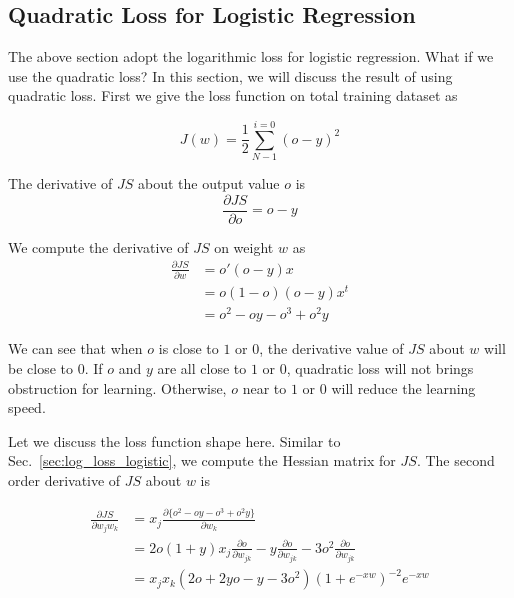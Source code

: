 \documentclass[runningheads,openany]{xhlPaper}
\begin{document}
\subsection{Quadratic Loss for Logistic Regression}
The above section adopt the logarithmic loss for logistic regression. What if we use the quadratic loss?
In this section, we will discuss the result of using quadratic loss.
First we give the loss function on total training dataset as

\begin{displaymath}
J\left ( w \right ) = \frac{1}{2} \sum_{N-1}^{i = 0} \left ( o - y \right ) ^ 2
\end{displaymath}

The derivative of $JS$ about the output value $o$ is
\begin{displaymath}
\frac{\partial JS}{\partial o} = o - y
\end{displaymath}

We compute the derivative of $JS$ on weight $w$ as
\begin{displaymath}
\begin{aligned}
\frac{\partial JS}{\partial w}&={o}{'}\left ( o - y \right )x\\
&=o\left ( 1 - o \right )\left ( o - y \right )x^t\\
&=o^2 - oy - o^3 + o^2 y
\end{aligned}
\end{displaymath}

We can see that when $o$ is close to $1$ or $0$, the derivative value of $JS$ about $w$ will be close to $0$. If $o$ and $y$ are all close to $1$ or $0$, quadratic loss will not brings obstruction for learning. Otherwise, $o$ near to $1$ or $0$ will reduce the learning speed.

Let we discuss the loss function shape here. Similar to Sec.~\ref{sec:log_loss_logistic}, we compute the Hessian matrix for $JS$. The second order derivative of $JS$ about $w$ is

\begin{displaymath}
\begin{aligned}
\frac{\partial JS}{\partial w_{j}w_{k}} &= x_{j}\frac{\partial \{o^2 - oy - o^3 + o^2 y\}}{\partial w_k}\\
&=2o\left ( 1 + y \right )x_{j}\frac{\partial o}{\partial w_{jk}} - y\frac{\partial o}{\partial w_{jk}} - 3o^2\frac{\partial o}{\partial w_{jk}}\\
&={x_j}{x_k}\left ( 2o + 2yo - y - 3o^2\right ){\left( {1 + {e^{ - xw}}} \right)^{ - 2}}{e^{ - xw}}
\end{aligned}
\end{displaymath}
\end{document}
